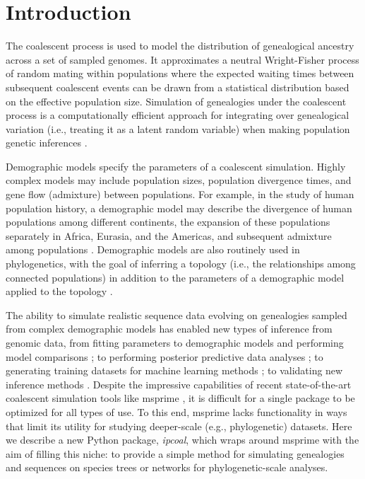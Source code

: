 \documentclass[11pt]{article}
\begin{document}
\RaggedRight
\bigskip

\section{Introduction}
The coalescent process \citep{hudson_testing_1983,kingman_coalescent_1982} is used to model the distribution of genealogical ancestry across a set of sampled genomes. It approximates a neutral Wright-Fisher process of random mating within populations where the expected waiting times between subsequent coalescent events can be drawn from a statistical distribution based on the effective population size. Simulation of genealogies under the coalescent process \citep{hudson_generating_2002} is a computationally efficient approach for integrating over genealogical variation (i.e., treating it as a latent random variable) when making population genetic inferences \citep{beerli_coalescent_2001}. 

Demographic models specify the parameters of a coalescent simulation. Highly complex models may include population sizes, population divergence times, and gene flow (admixture) between populations. For example, in the study of human population history, a demographic model may describe the divergence of human populations among different continents, the expansion of these populations separately in Africa, Eurasia, and the Americas, and subsequent admixture among populations \citep{reich_who_2018,gronau_demography_2011,green_neandertal_2010}. Demographic models are also routinely used in phylogenetics, with the goal of inferring a topology (i.e., the relationships among connected populations) in addition to the parameters of a demographic model applied to the topology \citep{knowles_estimating_2011,degnan_gene_2009}. 

The ability to simulate realistic sequence data evolving on genealogies sampled from complex demographic models has enabled new types of inference from genomic data, from fitting parameters to demographic models and performing model comparisons \citep{chung_bayesian_2017}; to performing posterior predictive data analyses \citep{brown_predictive_2014}; to generating training datasets for machine learning methods \citep{schrider_learning_2017}; to validating new inference methods \citep{adrion_community_maintained_2019}. Despite the impressive capabilities of recent state-of-the-art coalescent simulation tools like msprime \citep{kelleher_efficient_2016}, it is difficult for a single package to be optimized for all types of use. To this end, msprime lacks functionality in ways that limit its utility for studying deeper-scale (e.g., phylogenetic) datasets. Here we describe a new Python package, \emph{ipcoal}, which wraps around msprime with the aim of filling this niche: to provide a simple method for simulating genealogies and sequences on species trees or networks for phylogenetic-scale analyses.
\end{document}

